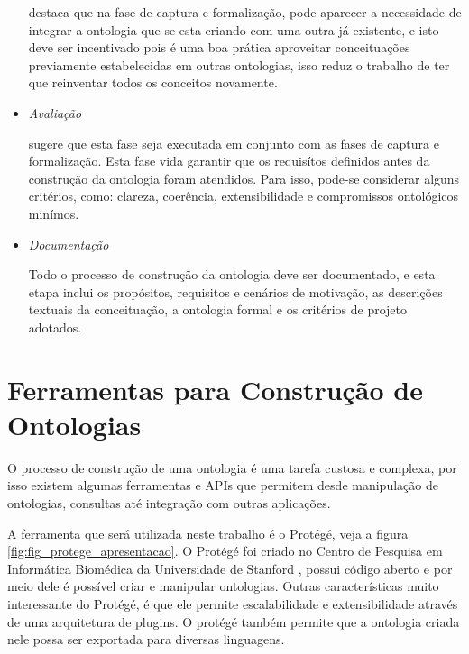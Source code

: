 \begin{itemize}
    \cite{falbo1998integracao} destaca que na fase de captura e formalização,
    pode aparecer a necessidade de integrar a ontologia que se esta criando com
    uma outra já existente, e isto deve ser incentivado pois é uma boa prática 
    aproveitar conceituações previamente estabelecidas em outras ontologias, isso
    reduz o trabalho de ter que reinventar todos os conceitos novamente.
    
    \item \textit{Avaliação}
    
    \cite{guizzardidesenvolvimento} sugere que esta fase seja executada em 
    conjunto com as fases de captura e formalização. Esta fase vida garantir 
    que os requisítos definidos antes da construção da ontologia foram atendidos.
    Para isso, pode-se considerar alguns critérios, como: clareza, coerência, 
    extensibilidade e compromissos ontológicos minímos.
    
    \item \textit{Documentação}
    
    Todo o processo de construção da ontologia deve ser documentado, e esta etapa
    inclui os propósitos, requisitos e cenários de motivação, as descrições 
    textuais da conceituação, a ontologia formal e os critérios de projeto 
    adotados.
\end{itemize}

\section{Ferramentas para Construção de Ontologias}
\label{sec:ferramentas_para_construcao_de_ontologias}

O processo de construção de uma ontologia é uma tarefa custosa e complexa, por 
isso existem algumas ferramentas e APIs que permitem desde manipulação de 
ontologias, consultas até integração com outras aplicações.

A ferramenta que será utilizada neste trabalho é o Protégé, veja a figura 
\ref{fig:fig_protege_apresentacao}. O Protégé foi criado 
no Centro de Pesquisa em Informática Biomédica da Universidade de Stanford 
\cite{protege}, possui código aberto e por meio dele é possível criar e
manipular ontologias. Outras características muito interessante do Protégé, 
é que ele permite escalabilidade e extensibilidade através de uma arquitetura de 
plugins. O protégé também permite que a ontologia criada nele possa ser 
exportada para diversas linguagens.

